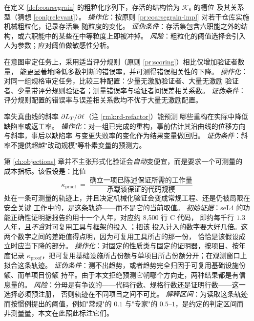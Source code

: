 \begin{hypothesis}[六职能是粗粒化下的存活集]\label{hyp:h10}
在定义 \ref{def:coarsegrain} 的粗粒化序列下，存活的结构恰为 $\mathcal{K}_6$ 的槽位
及其关系型（猜想 \ref{conj:relevant}）。
\emph{操作化}：按原则 \ref{pr:coarsegrain-impl} 对若干仓库实施机械粗粒化，记录存活集
随粒度的变化。
\emph{证伪条件}：存活集包含六职能之外的结构，或六职能中的某些在中等粒度上即被冲掉。
\emph{风险}：粗粒化的阈值选择会引入人为参数；应对阈值做敏感性分析。
\end{hypothesis}

\begin{hypothesis}[激励结构降低相关错误模式]\label{hyp:h11}
在意图审定任务上，采用适当评分规则（原则 \ref{pr:scoring}）相比仅增加验证者数量，
能更显著地降低多数判断的错误率，并可测得错误相关性的下降。
\emph{操作化}：对同一组规格审定任务，比较三种配置：少量无激励验证者、大量无激励
验证者、少量带评分规则验证者；测量错误率与验证者间误差相关系数。
\emph{证伪条件}：评分规则配置的错误率与误差相关系数均不优于大量无激励配置。
\end{hypothesis}

\begin{hypothesis}[率失真斜率预测重构收益]\label{hyp:h12}
率失真曲线的斜率 $\partial L_T / \partial \ell$（注 \ref{rmk:rd-refactor}）能预测
哪些重构在实际中降低缺陷率或返工率。
\emph{操作化}：对一组已完成的重构，事前估计其沿曲线的位移方向与斜率，事后以缺陷率
与变更失败率的变化作为结果变量做回归。
\emph{证伪条件}：斜率不提供超越"改动规模"等朴素变量的预测力。
\end{hypothesis}

\begin{hypothesis}[单位代码量的证明成本轨迹]\label{hyp:h13}
第 \ref{ch:objections} 章并不主张形式化验证会\emph{自动}变便宜，而是要求一个可测量的
成本指标。该假设是：比值
\[
\kappa_{\text{proof}} \;=\; \frac{\text{确立一项已陈述保证所需的工作量}}{\text{承载该保证的代码规模}}
\]
处在一条可测量的轨迹上，并且决定机械化验证会变成常规工程、还是仍被局限在安全关键
工作中的，是这条轨迹——而不是它的当前取值。
\emph{初始证据}：seL4 的功能正确性证明据报告约用十一个人年，对应约 8{,}500 行 C 代码，
即约每千行 $1.3$ 人年，且\emph{不含}对可复用工具与框架的投入 \cite{klein2009}；把该
投入计入的数字要大好几倍。这两个数字之间的差距值得点明，因为可复用工具所占的那一份，
恰恰是该假设成立时应当下降的部分。
\emph{操作化}：对固定的性质类与固定的证明器，按项目、按年度记录
$\kappa_{\text{proof}}$，把可复用基础设施所占份额与单项目所占份额分开；在观测窗口上
拟合这条轨迹。
\emph{证伪条件}：测不出趋势，或者趋势完全归因于可复用基础设施份额、而单项目份额
持平。由于本文拒绝预测它朝哪个方向走，两种结果都是有信息量的。
\emph{风险}：分母是有争议的——代码行数、规格行数还是证明行数——这一选择必须预注册，
否则轨迹在不同项目之间不可比。
\emph{解释区间}：为读取这条轨迹而按惯例提出的阈值，例如"常规"的 $0.1$ 与"专家"的
$0.5$--$1$，是约定的判定区间而非测量量，本文在此照此标注它们。
\end{hypothesis}

